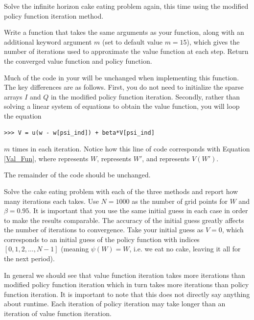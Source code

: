 \begin{problem}
Solve the infinite horizon cake eating problem again, this time using the modified policy function
iteration method.

Write a function  that takes the same arguments as your  function, along
with an additional keyword argument $m$ (set to default value $m=15$), which gives the number of iterations used
to approximate the value function at each step. Return the converged value function and policy function.

Much of the code in your  will be unchanged when implementing this function. The key differences are
as follows.
First, you do not need to initialize the sparse arrays $I$ and $Q$ in the modified policy function iteration.
Secondly, rather than solving a linear system of equations to obtain the value function, you will loop
the equation
\begin{lstlisting}
>>> V = u(w - w[psi_ind]) + beta*V[psi_ind]
\end{lstlisting}
$m$ times in each iteration. Notice how this line of code corresponds with Equation \eqref{Val_Fun}, where
 represents $W$,  represents $W'$, and  represents $V(W')$.

The remainder of the code should be unchanged.


\end{problem}

\begin{problem}
Solve the cake eating problem with each of the three methods and report how many iterations each takes.  Use $N= 1000$ as the
number of grid points for $W$ and $\beta = 0.95$.  It is important that you use the same initial guess in each case in order to
make the results comparable.  The accuracy of the initial guess greatly affects the number of iterations to convergence.  Take
your initial guess as $V = 0$, which corresponds to an initial guess of the policy function with indices $[0,1,2,\ldots, N-1]$
(meaning $\psi(W) = W$, i.e. we eat no cake, leaving it all for the next period).
\end{problem}

In general we should see that value function iteration takes more iterations than modified policy function iteration which in turn
takes more iterations than policy function iteration.  It is important to note that this does not directly say anything about runtime.
Each iteration of policy iteration may take longer than an iteration of value function iteration.

